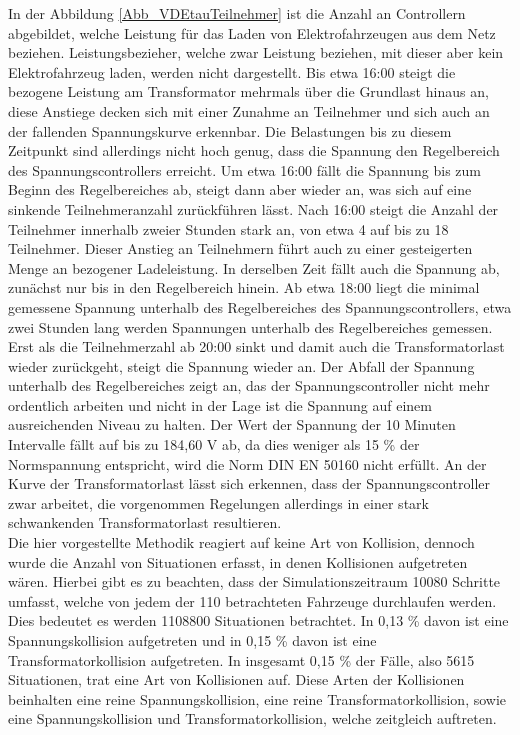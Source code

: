 In der Abbildung \ref{Abb_VDEtauTeilnehmer} ist die Anzahl an Controllern abgebildet, welche Leistung für das Laden von Elektrofahrzeugen aus dem Netz beziehen. Leistungsbezieher, welche zwar Leistung beziehen, mit dieser aber kein Elektrofahrzeug laden, werden nicht dargestellt. 
Bis etwa 16:00 steigt die bezogene Leistung am Transformator mehrmals über die Grundlast hinaus an, diese Anstiege decken sich mit einer Zunahme an Teilnehmer und sich auch an der fallenden Spannungskurve erkennbar. Die Belastungen bis zu diesem Zeitpunkt sind allerdings nicht hoch genug, dass die Spannung den Regelbereich des Spannungscontrollers erreicht. Um etwa 16:00 fällt die Spannung bis zum Beginn des Regelbereiches ab, steigt dann aber wieder an, was sich auf eine sinkende Teilnehmeranzahl zurückführen lässt. Nach 16:00 steigt die Anzahl der Teilnehmer innerhalb zweier Stunden stark an, von etwa 4 auf bis zu 18 Teilnehmer. Dieser Anstieg an Teilnehmern führt auch zu einer gesteigerten Menge an bezogener Ladeleistung. In derselben Zeit fällt auch die Spannung ab, zunächst nur bis in den Regelbereich hinein. Ab etwa 18:00 liegt die minimal gemessene Spannung unterhalb des Regelbereiches des Spannungscontrollers, etwa zwei Stunden lang werden Spannungen unterhalb des Regelbereiches gemessen. Erst als die Teilnehmerzahl ab 20:00 sinkt und damit auch die Transformatorlast wieder zurückgeht, steigt die Spannung wieder an. Der Abfall der Spannung unterhalb des Regelbereiches zeigt an, das der Spannungscontroller nicht mehr ordentlich arbeiten und nicht in der Lage ist die Spannung auf einem ausreichenden Niveau zu halten. Der Wert der Spannung der 10 Minuten Intervalle fällt auf bis zu 184,60 V ab, da dies weniger als 15 \% der Normspannung entspricht, wird die Norm DIN EN 50160 nicht erfüllt. An der Kurve der Transformatorlast lässt sich erkennen, dass der Spannungscontroller zwar arbeitet, die vorgenommen Regelungen allerdings in einer stark schwankenden Transformatorlast resultieren. \\

Die hier vorgestellte Methodik reagiert auf keine Art von Kollision, dennoch wurde die Anzahl von Situationen erfasst, in denen Kollisionen aufgetreten wären. Hierbei gibt es zu beachten, dass der Simulationszeitraum 10080 Schritte umfasst, welche von jedem der 110 betrachteten Fahrzeuge durchlaufen werden. Dies bedeutet es werden 1108800 Situationen betrachtet. In 0,13 \% davon ist eine Spannungskollision aufgetreten und in 0,15 \% davon ist eine Transformatorkollision aufgetreten. In insgesamt 0,15 \% der Fälle, also 5615 Situationen, trat eine Art von Kollisionen auf. Diese Arten der Kollisionen beinhalten eine reine Spannungskollision, eine reine Transformatorkollision, sowie eine Spannungskollision und Transformatorkollision, welche zeitgleich auftreten. \\

